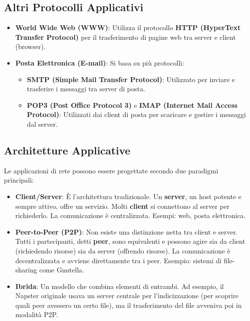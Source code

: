 \subsection{Altri Protocolli Applicativi}
\begin{itemize}
    \item \textbf{World Wide Web (WWW)}: Utilizza il protocollo \textbf{HTTP (HyperText Transfer Protocol)} per il trasferimento di pagine web tra server e client (browser).
    \item \textbf{Posta Elettronica (E-mail)}: Si basa su più protocolli:
    \begin{itemize}
        \item \textbf{SMTP (Simple Mail Transfer Protocol)}: Utilizzato per inviare e trasferire i messaggi tra server di posta.
        \item \textbf{POP3 (Post Office Protocol 3)} e \textbf{IMAP (Internet Mail Access Protocol)}: Utilizzati dai client di posta per scaricare e gestire i messaggi dal server.
    \end{itemize}
\end{itemize}

\subsection{Architetture Applicative}
Le applicazioni di rete possono essere progettate secondo due paradigmi principali:
\begin{itemize}
    \item \textbf{Client/Server}: È l'architettura tradizionale. Un \textbf{server}, un host potente e sempre attivo, offre un servizio. Molti \textbf{client} si connettono al server per richiederlo. La comunicazione è centralizzata. Esempi: web, posta elettronica.
    \item \textbf{Peer-to-Peer (P2P)}: Non esiste una distinzione netta tra client e server. Tutti i partecipanti, detti \textbf{peer}, sono equivalenti e possono agire sia da client (richiedendo risorse) sia da server (offrendo risorse). La comunicazione è decentralizzata e avviene direttamente tra i peer. Esempio: sistemi di file-sharing come Gnutella.
    \item \textbf{Ibrida}: Un modello che combina elementi di entrambi. Ad esempio, il Napster originale usava un server centrale per l'indicizzazione (per scoprire quali peer avessero un certo file), ma il trasferimento del file avveniva poi in modalità P2P.
\end{itemize}

